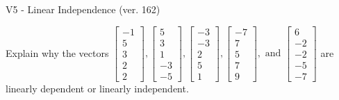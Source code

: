 \begin{exercise}
  \begin{exerciseTitle}V5 - Linear Independence (ver. 162)\end{exerciseTitle}
  \begin{exerciseStatement}
    Explain why the vectors \(\left[\begin{array}{r}
-1 \\
5 \\
3 \\
2 \\
2
\end{array}\right] , \left[\begin{array}{r}
5 \\
3 \\
1 \\
-3 \\
-5
\end{array}\right] , \left[\begin{array}{r}
-3 \\
-3 \\
2 \\
5 \\
1
\end{array}\right] , \left[\begin{array}{r}
-7 \\
7 \\
5 \\
7 \\
9
\end{array}\right] , \text{ and } \left[\begin{array}{r}
6 \\
-2 \\
-2 \\
-5 \\
-7
\end{array}\right]\) are linearly dependent or linearly independent.	



\end{exerciseStatement}
\end{exercise}
